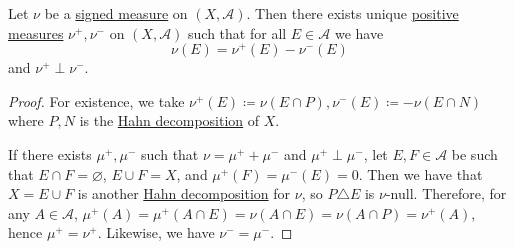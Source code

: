 \begin{theorem}\label{thm:Jordan-decomposition}
	Let \(\nu\) be a \hyperref[def:signed-measure]{signed measure} on \((X, \mathcal{A})\). Then there exists unique \hyperref[def:measure]{positive measures} \(\nu^+,\nu^-\) on \((X, \mathcal{A})\) such that for all \(E \in \mathcal{A}\) we have
	\[
		\nu(E) = \nu^+(E) - \nu^-(E)
	\]
	and \(\nu^+ \perp \nu^-\).
\end{theorem}
\begin{proof}
	For existence, we take \(\nu^+(E) \coloneqq \nu(E \cap P), \nu^-(E) \coloneqq -\nu(E \cap N)\) where \(P, N\) is the
	\hyperref[thm:Hahn-decomposition]{Hahn decomposition} of \(X\).

	If there exists \(\mu ^+, \mu ^-\) such that \(\nu = \mu ^+ + \mu ^-\) and \(\mu ^+ \perp \mu ^-\), let \(E, F\in \mathcal{A} \) be such that \(E\cap F = \varnothing \), \(E\cup F= X\), and \(\mu ^+(F) = \mu ^-(E) = 0\). Then we have that \(X = E \cup F\) is another \hyperref[thm:Hahn-decomposition]{Hahn decomposition} for \(\nu \), so \(P\triangle E\) is \(\nu\)-null. Therefore, for any \(A \in \mathcal{A} \), \(\mu ^+(A) = \mu ^+(A \cap E) = \nu (A \cap E) = \nu (A \cap P) = \nu ^+(A)\), hence \(\mu ^+ = \nu ^+\). Likewise, we have \(\nu ^- = \mu ^-\).
\end{proof}